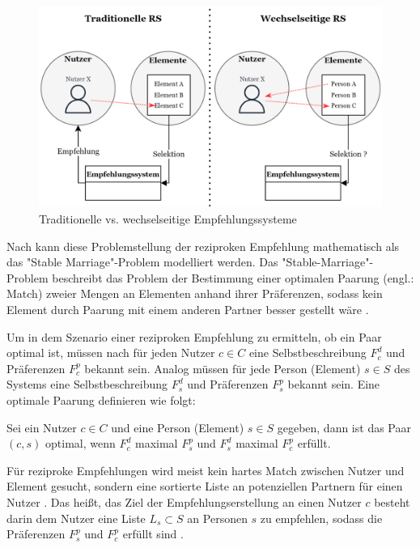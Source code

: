 \begin{figure}[H]
    \centering
	\includegraphics[width=1.0\textwidth]{gfx/traditional-vs-rrs.png}
	\caption[Traditionelle vs. wechselseitige Empfehlungssysteme]{Traditionelle vs. wechselseitige Empfehlungssysteme\\}
	\label{fig:empfehlungssysteme:rrs:abb1}
\end{figure}

Nach \textcite[S. 36]{li:inproceedings} kann diese Problemstellung der reziproken Empfehlung mathematisch als das "Stable Marriage"-Problem modelliert werden.
Das "Stable-Marriage"-Problem beschreibt das Problem der Bestimmung einer optimalen Paarung (engl.: Match) zweier Mengen an Elementen anhand ihrer Präferenzen, sodass kein Element durch Paarung mit einem anderen Partner besser gestellt wäre \cite[S. 36]{li:inproceedings}\cite[S. 67]{diaz:inproceedings}.

Um in dem Szenario einer reziproken Empfehlung zu ermitteln, ob ein Paar optimal ist, müssen nach \textcite[S. 36]{li:inproceedings} für jeden Nutzer $c \in C$ eine Selbstbeschreibung $F_{c}^{d}$ und Präferenzen $F_{c}^{p}$ bekannt sein.
Analog müssen für jede Person (Element) $s \in S$ des Systems eine Selbstbeschreibung $F_{s}^{d}$ und Präferenzen $F_{s}^{p}$ bekannt sein.
Eine optimale Paarung definieren \textcite[S. 36]{li:inproceedings} wie folgt: 

\begin{definition}\label{def:1}
    Sei ein Nutzer $c \in C$ und eine Person (Element) $s \in S$ gegeben, dann ist das Paar $(c,s)$ optimal, wenn $F_{c}^{d}$ maximal $F_{s}^{p}$ und $F_{s}^{d}$ maximal $F_{c}^{p}$ erfüllt.
\end{definition}

Für reziproke Empfehlungen wird meist kein hartes Match zwischen Nutzer und Element gesucht, sondern eine sortierte Liste an potenziellen Partnern für einen Nutzer \cite[S. 67]{diaz:inproceedings}.
Das heißt, das Ziel der Empfehlungserstellung an einen Nutzer $c$ besteht darin dem Nutzer eine Liste $L_{s} \subset S$ an Personen $s$ zu empfehlen, sodass die Präferenzen $F_{s}^{p}$ und $F_{c}^{p}$ erfüllt sind \cite[S. 36]{li:inproceedings}.

